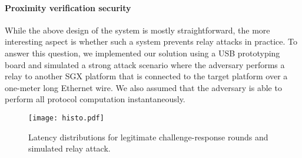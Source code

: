 


\paragraph{Proximity verification security} While the above design of the \proximitee system is mostly straightforward, the more interesting aspect is whether such a system prevents relay attacks in practice. To answer this question, we implemented our solution using a USB prototyping board and simulated a strong attack scenario where the adversary performs a relay to another SGX platform that is connected to the target platform over a one-meter long Ethernet wire. We also assumed that the adversary is able to perform all protocol computation instantaneously. 

\begin{figure}[t]
  \centering
    \texttt{[image: histo.pdf]} 
    \caption{Latency distributions for legitimate challenge-response rounds and simulated relay attack.}
    \label{graph:histogram}
\end{figure}

